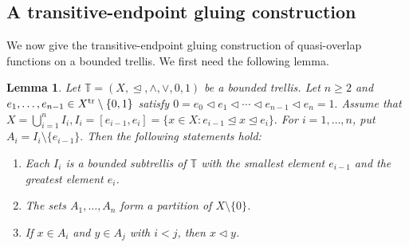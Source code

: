 \documentclass[preprint,12pt]{elsarticle}
\newtheorem{lemma}[theorem]{Lemma}
\begin{document}
\subsection{A transitive-endpoint gluing construction}
We now give the transitive-endpoint gluing construction of quasi-overlap functions on a
bounded trellis. We first need the following lemma.
\begin{lemma}\label{lem:interval-subtrellis}
Let $\mathbb{T}=(X,\trianglelefteq,\wedge,\vee,0,1)$ be a
bounded trellis. Let $n\ge2$ and
$e_1,\ldots,e_{n-1}\in X^{\rm tr}\setminus\{0,1\}$ satisfy
$
0=e_0\triangleleft e_1\triangleleft\cdots
\triangleleft e_{n-1}\triangleleft e_n=1.
$
Assume that
$
X=\bigcup_{i=1}^{n}I_i,
I_i=[e_{i-1},e_i]
=\{x\in X:e_{i-1}\trianglelefteq x\trianglelefteq e_i\}.
$
For $i=1,\ldots,n$, put
$
A_i=I_i\setminus\{e_{i-1}\}.
$
Then the following statements hold:
\begin{enumerate}[label=(\roman*)]
\item
Each $I_i$ is a bounded subtrellis of $\mathbb{T}$ with
the smallest element $e_{i-1}$ and the greatest element $e_i$.

\item
The sets $A_1,\ldots,A_n$ form a partition of
$X\setminus\{0\}$.

\item
If $x\in A_i$ and $y\in A_j$ with $i<j$, then
$x\triangleleft y$.
\end{enumerate}
\end{lemma}
\end{document}
